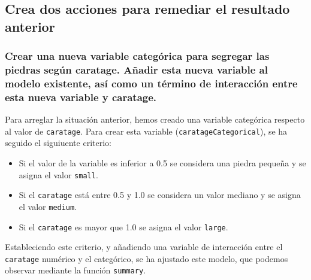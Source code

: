 \documentclass[a4paper, 9pt]{article}
\begin{document}
\subsection{Crea dos acciones para remediar el resultado anterior}
\label{subsec:question-3}

\subsubsection{Crear una nueva variable categórica para segregar las piedras según caratage. Añadir esta nueva variable al modelo existente, así como un término de interacción entre esta nueva variable y caratage.}

Para arreglar la situación anterior, hemos creado una variable categórica respecto al valor de \texttt{caratage}. Para crear esta variable (\texttt{caratageCategorical}), se ha seguido el siguiuente criterio:

\begin{itemize}
    \item Si el valor de la variable es inferior a 0.5 se considera una piedra pequeña y se asigna el valor \texttt{small}.
    \item Si el \texttt{caratage} está entre 0.5 y 1.0 se considera un valor mediano y se asigna el valor \texttt{medium}.
    \item Si el \texttt{caratage} es mayor que 1.0 se asigna el valor \texttt{large}.
\end{itemize}

Estableciendo este criterio, y añadiendo una variable de interacción entre el \texttt{caratage} numérico y el categórico, se ha ajustado este modelo, que podemos observar mediante la función \texttt{summary}.
\end{document}
